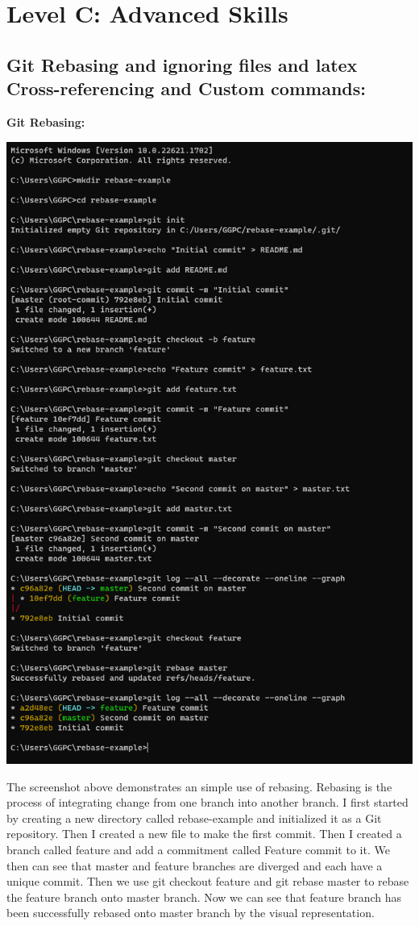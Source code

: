\documentclass[a4paper, 11pt]{report}
\begin{document}
\newpage
\section{Level C: Advanced Skills}
\subsection{Git Rebasing and ignoring files and latex Cross-referencing and Custom commands: \studA}
\textbf{Git Rebasing:}
\begin{center}
  \includegraphics[scale=0.5]{rebasing.png}
\end{center}
The screenshot above demonstrates an simple use of rebasing. Rebasing is the process of integrating change from one branch into another branch.\cite{atlassian-merging-vs-rebasing} I first started by creating a new directory called rebase-example and initialized it as a Git repository. Then I created a new file to make the first commit. Then I created a branch called feature and add a commitment called Feature commit to it. We then can see that master and feature branches are diverged and each have a unique commit. Then we use git checkout feature and git rebase master to rebase the feature branch onto master branch. Now we can see that feature branch has been successfully rebased onto master branch by the visual representation.
\end{document}
